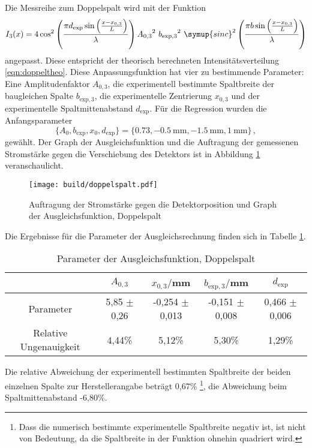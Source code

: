 Die Messreihe zum Doppelspalt wird mit der Funktion
\begin{equation*}
  I_3 (x) = 4 \cos^2\left(\frac{\pi d_\text{exp} \sin\left(\frac{x-x_{0,3}}{L}\right)}{\lambda}\right) {A_{0,3}}^2 \,\, {b_{\text{exp},3}}^2 \,\,
  \symup{sinc}^2\left(\frac{\pi b \sin\left(\frac{x-x_{0,3}}{L}\right)}{\lambda}\right)
\end{equation*}
angepasst. Diese entspricht der theorisch berechneten Intensitätsverteilung \eqref{eqn:doppeltheo}.
Diese Anpassungsfunktion hat vier zu bestimmende Parameter: Eine Amplitudenfaktor $A_{0,3}$,
die experimentell bestimmte Spaltbreite der baugleichen Spalte $b_{\text{exp},3}$,
die experimentelle Zentrierung $x_{0,3}$ und der experimentelle Spaltmittenabstand
$d_\text{exp}$.
Für die Regression wurden die Anfangsparameter
\begin{equation*}
  \{A_0, b_{\text{exp}}, x_0, d_\text{exp}\} = \{0.73, \SI{-0.5}{\milli\meter}, \SI{-1.5}{\milli\meter}, \SI{1}{\milli\meter}\}\,,
\end{equation*}
gewählt.
Der Graph der Ausgleichsfunktion und die Auftragung der gemessenen Stromstärke gegen
die Verschiebung des Detektors ist in Abbildung \ref{fig:spalt3} veranschaulicht.

\begin{figure}
  \centering
  \texttt{[image: build/doppelspalt.pdf]}
  \caption{Auftragung der Stromstärke gegen die Detektorposition und Graph der Ausgleichsfunktion, Doppelspalt}
  \label{fig:spalt3}
\end{figure}

Die Ergebnisse für die Parameter der Ausgleichsrechnung finden sich in Tabelle \ref{tab:paramsdoppel}.

\begin{table}
\centering
\begin{tabular}{ccccc}
\toprule
& $A_{0,3}$ & $x_{0,3}/$mm & $b_{\text{exp},3}/$mm & $d_\text{exp}$ \\
\midrule
Parameter & 5,85 $\pm$ 0,26 & -0,254 $\pm$ 0,013 & -0,151 $\pm$ 0,008 & 0,466 $\pm$ 0,006 \\
Relative Ungenauigkeit & 4,44\% & 5,12\% & 5,30\% & 1,29\%\\
\bottomrule
\end{tabular}
\caption{Parameter der Ausgleichsfunktion, Doppelspalt}
\label{tab:paramsdoppel}
\end{table}

Die relative Abweichung der experimentell bestimmten Spaltbreite der beiden einzelnen
Spalte zur Herstellerangabe beträgt 0,67\% \footnote{Dass die numerisch bestimmte
experimentelle Spaltbreite negativ ist, ist nicht von Bedeutung, da die Spaltbreite
in der Funktion ohnehin quadriert wird.}, die Abweichung beim Spaltmittenabstand
-6,80\%.

